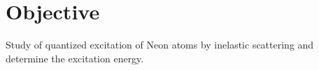 \section{Objective}

Study of quantized excitation of Neon atoms by inelastic scattering and determine the excitation energy.